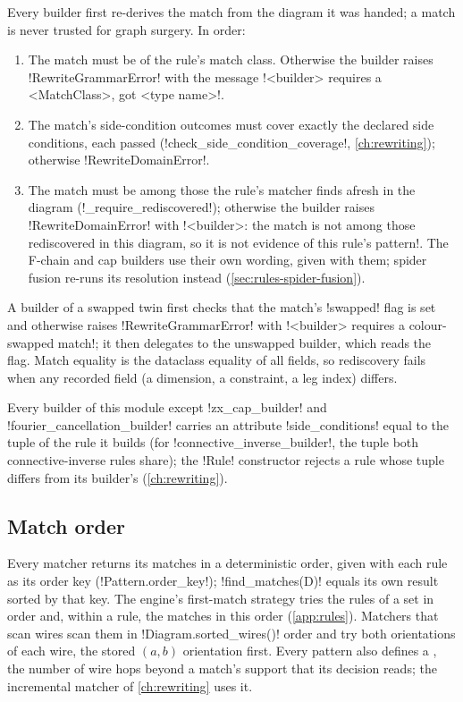 Every builder first re-derives the match from the diagram it was handed; a match is never trusted for graph surgery. In order:
\begin{enumerate}
\item The match must be of the rule's match class. Otherwise the builder raises \py!RewriteGrammarError! with the message \code!<builder> requires a <MatchClass>, got <type name>!.
\item The match's side-condition outcomes must cover exactly the declared side conditions, each passed (\py!check_side_condition_coverage!, \cref{ch:rewriting}); otherwise \py!RewriteDomainError!.
\item The match must be among those the rule's matcher finds afresh in the diagram (\py!_require_rediscovered!); otherwise the builder raises \py!RewriteDomainError! with \code!<builder>: the match is not among those rediscovered in this diagram, so it is not evidence of this rule's pattern!. The F-chain and cap builders use their own wording, given with them; spider fusion re-runs its resolution instead (\cref{sec:rules-spider-fusion}).
\end{enumerate}
A builder of a swapped twin first checks that the match's \py!swapped! flag is set and otherwise raises \py!RewriteGrammarError! with \code!<builder> requires a colour-swapped match!; it then delegates to the unswapped builder, which reads the flag. Match equality is the dataclass equality of all fields, so rediscovery fails when any recorded field (a dimension, a constraint, a leg index) differs.

Every builder of this module except \py!zx_cap_builder! and \py!fourier_cancellation_builder! carries an attribute \py!side_conditions! equal to the tuple of the rule it builds (for \py!connective_inverse_builder!, the tuple both connective-inverse rules share); the \py!Rule! constructor rejects a rule whose tuple differs from its builder's (\cref{ch:rewriting}).

\subsection{Match order}\label{sec:rules-order}

Every matcher returns its matches in a deterministic order, given with each rule as its order key (\py!Pattern.order_key!); \py!find_matches(D)! equals its own result sorted by that key. The engine's first-match strategy tries the rules of a set in order and, within a rule, the matches in this order (\cref{app:rules}). Matchers that scan wires scan them in \py!Diagram.sorted_wires()! order and try both orientations of each wire, the stored $(a,b)$ orientation first. Every pattern also defines a , the number of wire hops beyond a match's support that its decision reads; the incremental matcher of \cref{ch:rewriting} uses it.

